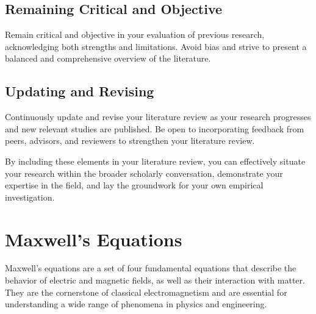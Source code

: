 \subsection{Remaining Critical and Objective}
Remain critical and objective in your evaluation of previous research, acknowledging both strengths and limitations.
Avoid bias and strive to present a balanced and comprehensive overview of the literature.

\subsection{Updating and Revising}
Continuously update and revise your literature review as your research progresses and new relevant studies are published.
Be open to incorporating feedback from peers, advisors, and reviewers to strengthen your literature review.

By including these elements in your literature review, you can effectively situate your research within the broader scholarly conversation, demonstrate your expertise in the field, and lay the groundwork for your own empirical investigation.


\section{Maxwell's Equations}
Maxwell's equations are a set of four fundamental equations that describe the behavior of electric and magnetic fields, as well as their interaction with matter.
They are the cornerstone of classical electromagnetism and are essential for understanding a wide range of phenomena in physics and engineering.

